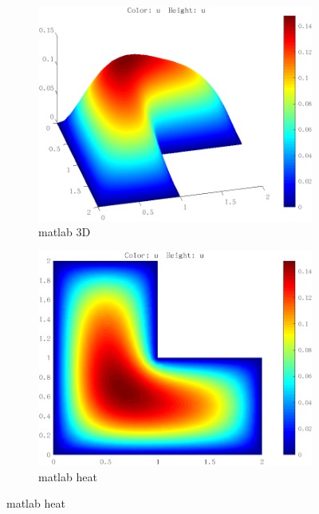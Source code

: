 \begin{figure}[H]
    \begin{subfigure}{0.5\textwidth}  
        \centering  
        \includegraphics[width=0.9\linewidth]{./pics/final/possion/2d/matlabirregular3D.png}  
        \caption{matlab 3D}  
    \end{subfigure}%
    \begin{subfigure}{0.5\textwidth}  
        \centering  
        \includegraphics[width=0.9\linewidth]{./pics/final/possion/2d/matlabirregularheat.png}  
        \caption{matlab heat}
    \end{subfigure} 
\end{figure} 

